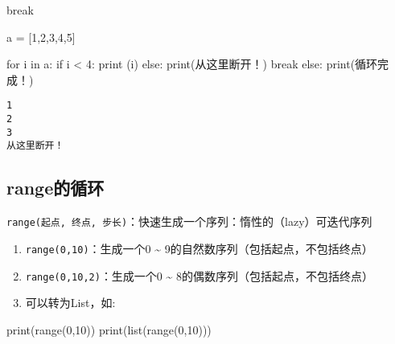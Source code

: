 \documentclass[
  letterpaper,
  DIV=11,
  numbers=noendperiod]{scrreprt}
\newenvironment{Shaded}{\begin{snugshade}}{\end{snugshade}}
\newcommand{\BuiltInTok}[1]{\textcolor[rgb]{0.00,0.23,0.31}{#1}}
\newcommand{\ControlFlowTok}[1]{\textcolor[rgb]{0.00,0.23,0.31}{#1}}
\newcommand{\DecValTok}[1]{\textcolor[rgb]{0.68,0.00,0.00}{#1}}
\newcommand{\KeywordTok}[1]{\textcolor[rgb]{0.00,0.23,0.31}{#1}}
\newcommand{\NormalTok}[1]{\textcolor[rgb]{0.00,0.23,0.31}{#1}}
\newcommand{\OperatorTok}[1]{\textcolor[rgb]{0.37,0.37,0.37}{#1}}
\newcommand{\StringTok}[1]{\textcolor[rgb]{0.13,0.47,0.30}{#1}}
\providecommand{\tightlist}{%
  \setlength{\itemsep}{0pt}\setlength{\parskip}{0pt}}\usepackage{longtable,booktabs,array}
\begin{document}
break

\begin{Shaded}
\begin{Highlighting}[]
\NormalTok{a }\OperatorTok{=}\NormalTok{ [}\DecValTok{1}\NormalTok{,}\DecValTok{2}\NormalTok{,}\DecValTok{3}\NormalTok{,}\DecValTok{4}\NormalTok{,}\DecValTok{5}\NormalTok{]}

\ControlFlowTok{for}\NormalTok{ i }\KeywordTok{in}\NormalTok{ a:}
    \ControlFlowTok{if}\NormalTok{ i }\OperatorTok{\textless{}} \DecValTok{4}\NormalTok{:}
        \BuiltInTok{print}\NormalTok{ (i)}
    \ControlFlowTok{else}\NormalTok{:}
        \BuiltInTok{print}\NormalTok{(}\StringTok{\textquotesingle{}从这里断开！\textquotesingle{}}\NormalTok{)}
        \ControlFlowTok{break}
\ControlFlowTok{else}\NormalTok{:}
    \BuiltInTok{print}\NormalTok{(}\StringTok{\textquotesingle{}循环完成！\textquotesingle{}}\NormalTok{)}
\end{Highlighting}
\end{Shaded}

\begin{verbatim}
1
2
3
从这里断开！
\end{verbatim}

\hypertarget{rangeux7684ux5faaux73af}{%
\subsection{range的循环}\label{rangeux7684ux5faaux73af}}

\texttt{range(起点,\ 终点,\ 步长)}：快速生成一个序列：惰性的（lazy）可迭代序列

\begin{enumerate}
\def\labelenumi{\arabic{enumi}.}
\tightlist
\item
  \texttt{range(0,10)}：生成一个0 \textasciitilde{}
  9的自然数序列（包括起点，不包括终点）
\item
  \texttt{range(0,10,2)}：生成一个0 \textasciitilde{}
  8的偶数序列（包括起点，不包括终点）
\item
  可以转为List，如:
\end{enumerate}

\begin{Shaded}
\begin{Highlighting}[]
\BuiltInTok{print}\NormalTok{(}\BuiltInTok{range}\NormalTok{(}\DecValTok{0}\NormalTok{,}\DecValTok{10}\NormalTok{))}
\BuiltInTok{print}\NormalTok{(}\BuiltInTok{list}\NormalTok{(}\BuiltInTok{range}\NormalTok{(}\DecValTok{0}\NormalTok{,}\DecValTok{10}\NormalTok{))) }
\end{Highlighting}
\end{Shaded}
\end{document}

